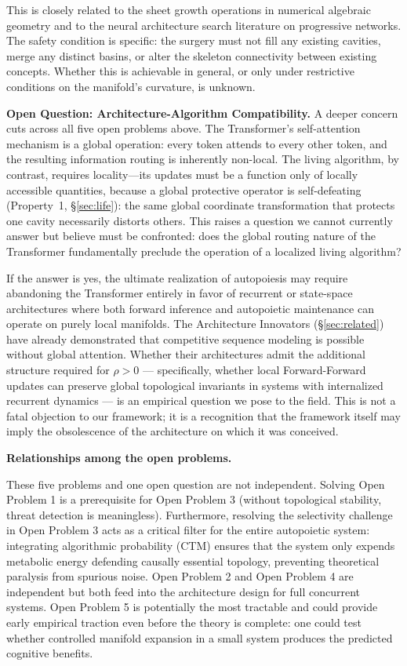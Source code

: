 \documentclass{article}
\begin{document}
This is closely related to the sheet growth operations in numerical algebraic geometry and to the neural architecture search literature on progressive networks. The safety condition is specific: the surgery must not fill any existing cavities, merge any distinct basins, or alter the skeleton connectivity between existing concepts. Whether this is achievable in general, or only under restrictive conditions on the manifold's curvature, is unknown.

\bigskip
\noindent\textbf{Open Question: Architecture-Algorithm Compatibility.}
A deeper concern cuts across all five open problems above. The Transformer's self-attention mechanism is a global operation: every token attends to every other token, and the resulting information routing is inherently non-local. The living algorithm, by contrast, requires locality---its updates must be a function only of locally accessible quantities, because a global protective operator is self-defeating (Property~1, \S\ref{sec:life}): the same global coordinate transformation that protects one cavity necessarily distorts others. This raises a question we cannot currently answer but believe must be confronted: does the global routing nature of the Transformer fundamentally preclude the operation of a localized living algorithm?

If the answer is yes, the ultimate realization of autopoiesis may require abandoning the Transformer entirely in favor of recurrent or state-space architectures \citep{Gu2023mamba,Peng2023rwkv} where both forward inference and autopoietic maintenance can operate on purely local manifolds. The Architecture Innovators (\S\ref{sec:related}) have already demonstrated that competitive sequence modeling is possible without global attention. Whether their architectures admit the additional structure required for $\rho > 0$ --- specifically, whether local Forward-Forward updates can preserve global topological invariants in systems with internalized recurrent dynamics --- is an empirical question we pose to the field. This is not a fatal objection to our framework; it is a recognition that the framework itself may imply the obsolescence of the architecture on which it was conceived.

\bigskip
\noindent\textbf{Relationships among the open problems.}

These five problems and one open question are not independent. Solving Open Problem 1 is a prerequisite for Open Problem 3 (without topological stability, threat detection is meaningless). Furthermore, resolving the selectivity challenge in Open Problem 3 acts as a critical filter for the entire autopoietic system: integrating algorithmic probability (CTM) ensures that the system only expends metabolic energy defending causally essential topology, preventing theoretical paralysis from spurious noise. Open Problem 2 and Open Problem 4 are independent but both feed into the architecture design for full concurrent systems. Open Problem 5 is potentially the most tractable and could provide early empirical traction even before the theory is complete: one could test whether controlled manifold expansion in a small system produces the predicted cognitive benefits.
\end{document}
